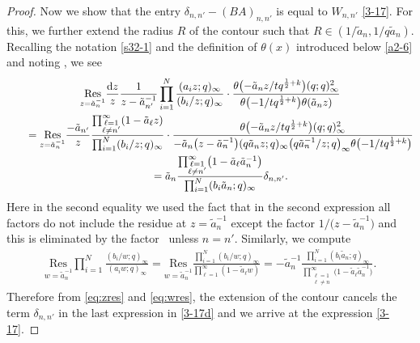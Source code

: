 \documentclass[pdftex]{sigma}
\numberwithin{equation}{section}
\def\i{\infty}
\begin{document}
\begin{proof}
 Now we show that the entry $\delta_{n,n'}-(BA)_{n,n'}$ is equal to $W_{n,n'}$ \eqref{3-17}. For this, we further extend the radius $R$ of the contour such that $R\in(1/\tilde{a}_n,1/q\tilde{a}_n)$. Recalling the notation \eqref{s32-1} and the definition of $\theta (x)$ introduced below \eqref{a2-6} and
 noting ,
 we see
 \begin{gather}
 \underset{z=\tilde{a}_{n}^{-1}}{\text{Res}}
 \frac{{\rm d}z}{z}
 \frac{1}{z-\tilde{a}_{n'}^{-1}}
 \prod_{i=1}^N\frac{(a_i z;q)_{\i}}{(b_i/z;q)_{\i}}
 \cdot
 \frac{\theta\bigl(-\tilde{a}_{n}z/tq^{\frac12+k}\bigr)(q;q)_{\i}^2}{\theta\bigl(-1/tq^{\frac12+k}\bigr)\theta(\tilde{a}_n z)}\nonumber \\
 \qquad=\underset{z=\tilde{a}_{n}^{-1}}{\text{Res}}
 \frac{-\tilde{a}_{n'}}{z}
 \frac{\prod_{\substack{\ell=1\\ \ell\neq n'}}^{\infty}(1-\tilde{a}_\ell z)}{\prod_{i=1}^N(b_i/z;q)_{\i}}
 \cdot
 \frac{\theta\bigl(-\tilde{a}_{n}z/tq^{\frac12+k}\bigr)(q;q)_{\i}^2}{-\tilde{a}_n\bigl(z-\tilde{a}_n^{-1}\bigr)(q\tilde{a}_nz;q)_\infty \bigl(q\tilde{a}_n^{-1}/z;q\bigr)_\infty\theta\bigl(-1/tq^{\frac12+k}\bigr)}
 \nonumber\\
 \qquad = \tilde{a}_n
 \frac{\prod_{\substack{\ell=1\\ \ell\neq n'}}^{\infty}\bigl(1-\tilde{a}_\ell \tilde{a}_n^{-1}\bigr)}{\prod_{i=1}^N(b_i \tilde{a}_n;q)_{\i}}\delta_{n,n'}. \label{eq:zres}
 \end{gather}
 Here in the second equality we used the fact that in the second expression all factors do not include the residue at $z=\tilde{a}_n^{-1}$ except the factor $1/\big(z-\tilde{a}_n^{-1}\big)$ and this is eliminated by the factor~ unless $n=n'$.
 Similarly, we compute
 \begin{align}\label{eq:wres}
 \underset{w=\tilde{a}_{n}^{-1}}{\text{Res}}
 \prod_{i=1}^N\frac{(b_i/w;q)_{\i}}{(a_i w;q)_{\i}}=\underset{w=\tilde{a}_{n}^{-1}}{\text{Res}}\frac{\prod_{i=1}^N(b_i/w;q)_{\i}}{\prod_{\ell=1}^{\infty}(1-\tilde{a}_{\ell}w)}=-\tilde{a}_n^{-1}
 \frac{\prod_{i=1}^N(b_i \tilde{a}_n;q)_{\i}}{\prod_{\substack{\ell=1\\ \ell\neq n}}^{\infty}\big(1-\tilde{a}_\ell \tilde{a}_n^{-1}\big)}.
 \end{align}
 Therefore from \eqref{eq:zres} and \eqref{eq:wres}, the extension of the contour cancels the term $\delta_{n,n'}$ in the last expression in \eqref{3-17d} and we arrive at the expression \eqref{3-17}.
 \end{proof}
\end{document}

